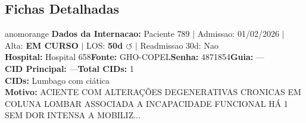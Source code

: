 \documentclass[a4paper,10pt]{article}
\begin{document}
\subsection{Fichas Detalhadas}
\begin{anomalycard}[Internacao 673 | GHO-COPEL | ALTO (z=4.29)]{anomorange}
\textbf{Dados da Internacao:} Paciente 789 $\mid$ Admissao: 01/02/2026 $\mid$ Alta: \textcolor{anomorange}{\textbf{EM CURSO}} $\mid$ LOS: \textbf{50d \textcolor{anomorange}{$\circlearrowleft$}} $\mid$ Readmissao 30d: Nao\\
\textbf{Hospital:} Hospital 658\quad\textbf{Fonte:} GHO-COPEL\quad\textbf{Senha:} 4871854\quad\textbf{Guia:} ---\\
\textbf{CID Principal:} {\small ---}\quad\textbf{Total CIDs:} 1\\

\textbf{CIDs:} {\scriptsize Lumbago com ciática}\\

\textbf{Motivo:} {\scriptsize ACIENTE COM ALTERAÇÕES DEGENERATIVAS CRONICAS EM COLUNA LOMBAR ASSOCIADA A INCAPACIDADE FUNCIONAL HÁ 1 SEM  DOR INTENSA A MOBILIZ...}\\


\end{anomalycard}
\end{document}
